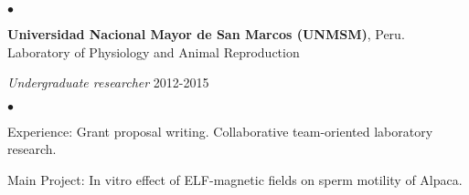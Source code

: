 \documentclass[margin,line]{res}
\newenvironment{list1}{
  \begin{list}{\ding{113}}{%
      \setlength{\itemsep}{0in}
      \setlength{\parsep}{0in} \setlength{\parskip}{0in}
      \setlength{\topsep}{0in} \setlength{\partopsep}{0in}
      \setlength{\leftmargin}{0.17in}}}{\end{list}}
\newenvironment{list2}{
  \begin{list}{$\bullet$}{%
      \setlength{\itemsep}{0in}
      \setlength{\parsep}{0in} \setlength{\parskip}{0in}
      \setlength{\topsep}{0in} \setlength{\partopsep}{0in}
      \setlength{\leftmargin}{0.2in}}}{\end{list}}
\begin{document}
\begin{resume}
\begin{list1}
\begin{list2}
	\end{list2}
\end{list1}

{\bf Universidad Nacional Mayor de San Marcos (UNMSM)}, Peru.\\
Laboratory of Physiology and Animal Reproduction\\
\vspace*{-.1in}
\begin{list1}
	\item[] {\em Undergraduate researcher} \hfill 2012-2015\\%
	\vspace*{-.1in}
	\begin{list2} %
		\item Experience: Grant proposal writing. Collaborative team-oriented laboratory research. %
		\item Main Project: In vitro effect of ELF-magnetic fields on sperm motility of Alpaca.\\ %
	\end{list2}
\end{list1}


\end{resume}
\end{document}
